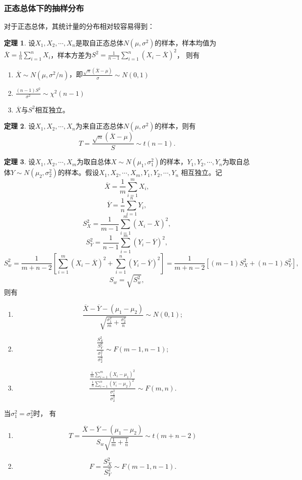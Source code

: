 \documentclass[a4paper,11pt]{article}%
\theoremstyle{remark}
\theoremstyle{remark}
\theoremstyle{definition}
\newtheorem{theorem}{定理}[section]
\theoremstyle{definition}
\theoremstyle{plain}
\begin{document}
\subsubsection{正态总体下的抽样分布}
对于正态总体，其统计量的分布相对较容易得到：
\begin{theorem}
    设$X_1,X_2,\cdots,X_n$是取自正态总体$N(\mu,\sigma^2)$的样本，样本均值为$\overline{X}=\frac{1}{n}\sum_{i=1}^{n}X_i$，样本方差为$S^2=\frac{1}{n-1}\sum_{i=1}^{n}(X_i-\overline{X})^2$，
    则有 
    \begin{enumerate}
        \item$\overline{X}\sim N(\mu,\sigma^2/n)$，即$\frac{\sqrt{n}(\overline{X}-\mu)}{\sigma}\sim N(0,1)$
        \item$\frac{(n-1)S^2}{\sigma^2}\sim \chi^2(n-1)$
        \item$\overline{X}$与$S^2$相互独立。
    \end{enumerate}
\end{theorem}
\begin{theorem}
    设$X_1,X_2,\cdots,X_n$为来自正态总体$N(\mu,\sigma^2)$的样本，则有 
    \[T=\frac{\sqrt{n}(\overline{X}-\mu)}{S}\sim t(n-1).\]
\end{theorem}
\begin{theorem}
    设$X_1,X_2,\cdots,X_m$为取自总体$X\sim N(\mu_1,\sigma_1^2)$的样本，$Y_1,Y_2,\cdots,Y_n$为取自总体$Y\sim N(\mu_2,\sigma_2^2)$的样本。假设$X_1,X_2,\cdots,X_m,Y_1,Y_2,\cdots,Y_n$
    相互独立。记
    \[\overline{X}=\frac{1}{m}\sum_{i=1}^{m}X_i,\]
    \[\overline{Y}=\frac{1}{n}\sum_{i=1}^{n}Y_i,\]
    \[S_X^2=\frac{1}{m-1}\sum_{i=1}^{m}(X_i-\overline{X})^2,\]
    \[S_Y^2=\frac{1}{n-1}\sum_{i=1}^{m}(Y_i-\overline{Y})^2,\]
    \[S_w^2=\frac{1}{m+n-2}[\sum_{i=1}^{m}(X_i-\overline{X})^2+\sum_{i=1}^{n}(Y_i-\overline{Y})^2]=\frac{1}{m+n-2}[(m-1)S_X^2+(n-1)S_Y^2],\]
    \[S_w=\sqrt{S_w^2},\]
    则有
    \begin{enumerate}
        \item \[\frac{\overline{X}-\overline{Y}-(\mu_1-\mu_2)}{\sqrt{\frac{\sigma_1^2}{m}+\frac{\sigma_2^2}{n}}}\sim N(0,1);\]
        \item \[ \frac{\frac{S_X^2}{S_Y^2}}{\frac{\sigma_1^2}{\sigma_2^2}}\sim F(m-1,n-1);\]
        \item \[\frac{\frac{\frac{1}{m}\sum_{i=1}^{m}(X_i-\mu_1)^2}{\frac{1}{n}\sum_{i=1}^{n}(Y_i-\mu_2)^2}}{\frac{\sigma_1^2}{\sigma_2^2}}\sim F(m,n).\]
    \end{enumerate}
    当$\sigma_1^2=\sigma_2^2$时， 有
    \begin{enumerate}
        \item \[T=\frac{\overline{X}-\overline{Y}-(\mu_1-\mu_2)}{S_w\sqrt{\frac{1}{m}+\frac{1}{n}}}\sim t(m+n-2)\]
        \item \[F=\frac{S_X^2}{S_Y^2}\sim F(m-1,n-1).\]
    \end{enumerate}
\end{theorem}
\end{document}
